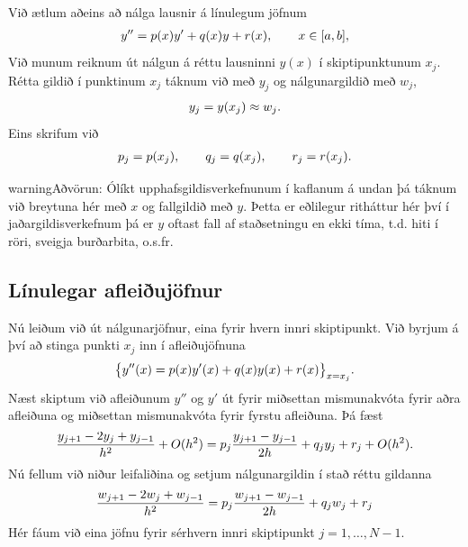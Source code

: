 \documentclass[letterpaper,10pt,icelandic]{sphinxmanual}
\begin{document}
Við ætlum aðeins að nálga lausnir á línulegum jöfnum
\begin{gather}
\begin{split}y''=p(x)y'+q(x)y+r(x), \qquad x\in [a,b],\end{split}\notag
\end{gather}
Við munum reiknum út nálgun á réttu lausninni \(y(x)\) í skiptipunktunum \(x_j\).
Rétta gildið í punktinum \(x_j\) táknum við með \(y_j\) og
nálgunargildið með \(w_j\),
\begin{gather}
\begin{split}y_j=y(x_j)\approx w_j.\end{split}\notag
\end{gather}
Eins skrifum við
\begin{gather}
\begin{split}p_j=p(x_j), \qquad q_j=q(x_j), \qquad  r_j=r(x_j).\end{split}\notag
\end{gather}
\begin{notice}{warning}{Aðvörun:}
Ólíkt upphafsgildisverkefnunum í kaflanum á undan þá táknum við breytuna
hér með \(x\) og fallgildið með \(y\). Þetta er eðlilegur ritháttur
hér því í jaðargildisverkefnum þá er \(y\) oftast fall
af staðsetningu en ekki tíma, t.d. hiti í röri, sveigja burðarbita, o.s.fr.
\end{notice}


\subsection{Línulegar afleiðujöfnur}
\label{kafli07:index-3}\label{kafli07:linulegar-afleiujofnur}
Nú leiðum við út nálgunarjöfnur, eina fyrir hvern innri skiptipunkt. Við
byrjum á því að stinga punkti \(x_j\) inn í afleiðujöfnuna
\begin{gather}
\begin{split}\big\{ y''(x)= p(x)y'(x)+q(x)y(x) + r(x)\big\}_{x=x_j}.\end{split}\notag
\end{gather}
Næst skiptum við afleiðunum \(y''\) og \(y'\) út fyrir
miðsettan mismunakvóta fyrir aðra afleiðuna og
miðsettan mismunakvóta fyrir fyrstu afleiðuna. Þá fæst
\begin{gather}
\begin{split}\dfrac{y_{j+1}-2y_j+y_{j-1}}{h^2} +O(h^2)
=p_j\dfrac{y_{j+1}-y_{j-1}}{2h}+q_jy_j+r_j+ O(h^2).\end{split}\notag
\end{gather}
Nú fellum við niður leifaliðina og setjum nálgunargildin í stað réttu
gildanna
\begin{gather}
\begin{split}\dfrac{w_{j+1}-2w_j+w_{j-1}}{h^2}
=p_j\dfrac{w_{j+1}-w_{j-1}}{2h}+q_jw_j+r_j\end{split}\notag
\end{gather}
Hér fáum við eina jöfnu fyrir sérhvern innri skiptipunkt
\(j=1,\dots,N-1\).
\end{document}
